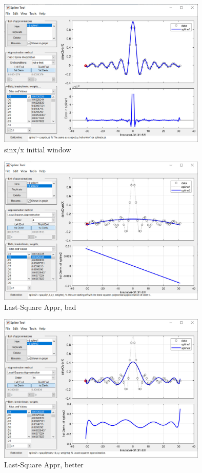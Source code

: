 \documentclass{article}
\begin{document}
\begin{figure}
\centering
\includegraphics[width=10cm]{img/My_shot_window.jpg}
\caption{sinx/x  initial window}
\end{figure}

\begin{figure}
\centering
\includegraphics[width=10cm]{img/bad.jpg}
\caption{Last-Square Appr, bad }
\end{figure}

\begin{figure}
\centering
\includegraphics[width=10cm]{img/better.jpg}
\caption{Last-Square Appr, better}
\end{figure}
\end{document}
